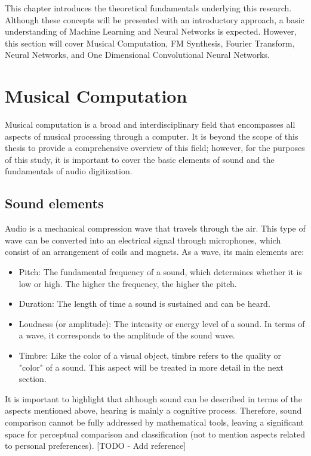 This chapter introduces the theoretical fundamentals underlying this research. Although these concepts will be presented with an introductory approach, a basic understanding of Machine Learning and Neural Networks is expected. However, this section will cover Musical Computation, FM Synthesis, Fourier Transform, Neural Networks, and One Dimensional Convolutional Neural Networks.

\section{Musical Computation}

Musical computation is a broad and interdisciplinary field that encompasses all aspects of musical processing through a computer. It is beyond the scope of this thesis to provide a comprehensive overview of this field; however, for the purposes of this study, it is important to cover the basic elements of sound and the fundamentals of audio digitization.

\subsection{Sound elements}

Audio is a mechanical compression wave that travels through the air. This type of wave can be converted into an electrical signal through microphones, which consist of an arrangement of coils and magnets. As a wave, its main elements are:

\begin{itemize}
    \item Pitch: The fundamental frequency of a sound, which determines whether it is low or high. The higher the frequency, the higher the pitch.
    \item Duration: The length of time a sound is sustained and can be heard.
    \item Loudness (or amplitude): The intensity or energy level of a sound. In terms of a wave, it corresponds to the amplitude of the sound wave.
    \item Timbre: Like the color of a visual object, timbre refers to the quality or "color" of a sound. This aspect will be treated in more detail in the next section.
\end{itemize}

It is important to highlight that although sound can be described in terms of the aspects mentioned above, hearing is mainly a cognitive process. Therefore, sound comparison cannot be fully addressed by mathematical tools, leaving a significant space for perceptual comparison and classification (not to mention aspects related to personal preferences). [TODO - Add reference]

